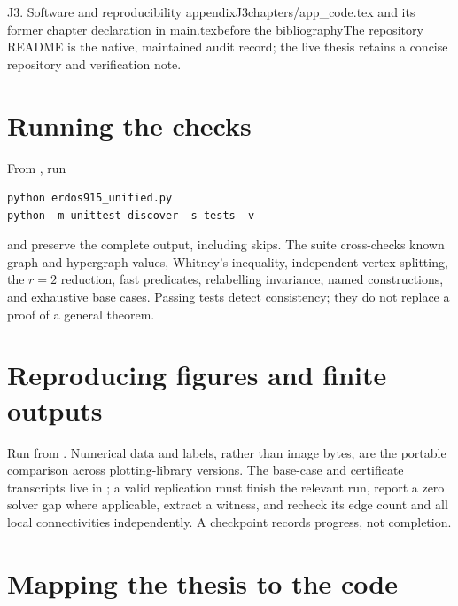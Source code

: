 \begin{offcut}{J3. Software and reproducibility appendix}{J3}{chapters/app\_code.tex and its former chapter declaration in main.tex}{before the bibliography}{The repository README is the native, maintained audit record; the live thesis retains a concise repository and verification note.}
\section{Running the checks}

From , run
\begin{verbatim}
python erdos915_unified.py
python -m unittest discover -s tests -v
\end{verbatim}
and preserve the complete output, including skips. The suite cross-checks known graph and hypergraph values, Whitney's inequality, independent vertex splitting, the $r=2$ reduction, fast predicates, relabelling invariance, named constructions, and exhaustive base cases. Passing tests detect consistency; they do not replace a proof of a general theorem.

\section{Reproducing figures and finite outputs}

Run  from . Numerical data and labels, rather than image bytes, are the portable comparison across plotting-library versions. The base-case and certificate transcripts live in ; a valid replication must finish the relevant run, report a zero solver gap where applicable, extract a witness, and recheck its edge count and all local connectivities independently. A checkpoint records progress, not completion.

\section{Mapping the thesis to the code}\label{app:software-map}


\end{offcut}
